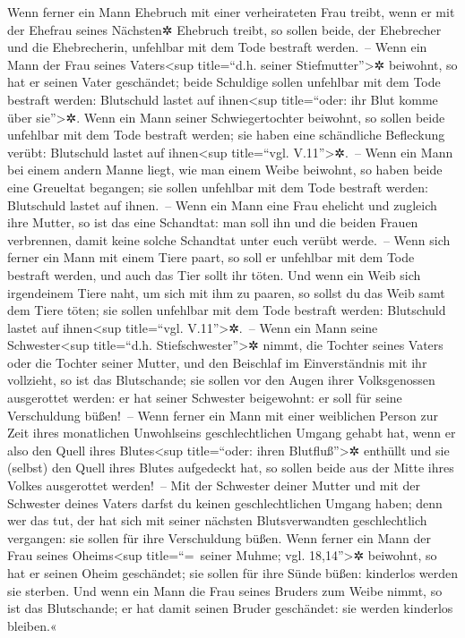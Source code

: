 Wenn ferner ein Mann Ehebruch mit einer verheirateten
Frau treibt, wenn er mit der Ehefrau seines Nächsten✲ Ehebruch treibt,
so sollen beide, der Ehebrecher und die Ehebrecherin, unfehlbar mit dem
Tode bestraft werden.~-- Wenn ein Mann der Frau seines
Vaters\textless sup title=``d.h. seiner Stiefmutter''\textgreater✲
beiwohnt, so hat er seinen Vater geschändet; beide Schuldige sollen
unfehlbar mit dem Tode bestraft werden: Blutschuld lastet auf
ihnen\textless sup title=``oder: ihr Blut komme über sie''\textgreater✲.
Wenn ein Mann seiner Schwiegertochter beiwohnt, so sollen
beide unfehlbar mit dem Tode bestraft werden; sie haben eine schändliche
Befleckung verübt: Blutschuld lastet auf ihnen\textless sup title=``vgl.
V.11''\textgreater✲.~-- Wenn ein Mann bei einem andern
Manne liegt, wie man einem Weibe beiwohnt, so haben beide eine Greueltat
begangen; sie sollen unfehlbar mit dem Tode bestraft werden: Blutschuld
lastet auf ihnen.~-- Wenn ein Mann eine Frau ehelicht und
zugleich ihre Mutter, so ist das eine Schandtat: man soll ihn und die
beiden Frauen verbrennen, damit keine solche Schandtat unter euch verübt
werde.~-- Wenn sich ferner ein Mann mit einem Tiere
paart, so soll er unfehlbar mit dem Tode bestraft werden, und auch das
Tier sollt ihr töten. Und wenn ein Weib sich irgendeinem
Tiere naht, um sich mit ihm zu paaren, so sollst du das Weib samt dem
Tiere töten; sie sollen unfehlbar mit dem Tode bestraft werden:
Blutschuld lastet auf ihnen\textless sup title=``vgl.
V.11''\textgreater✲.~-- Wenn ein Mann seine
Schwester\textless sup title=``d.h. Stiefschwester''\textgreater✲ nimmt,
die Tochter seines Vaters oder die Tochter seiner Mutter, und den
Beischlaf im Einverständnis mit ihr vollzieht, so ist das Blutschande;
sie sollen vor den Augen ihrer Volksgenossen ausgerottet werden: er hat
seiner Schwester beigewohnt: er soll für seine Verschuldung büßen!~--
Wenn ferner ein Mann mit einer weiblichen Person zur Zeit
ihres monatlichen Unwohlseins geschlechtlichen Umgang gehabt hat, wenn
er also den Quell ihres Blutes\textless sup title=``oder: ihren
Blutfluß''\textgreater✲ enthüllt und sie (selbst) den Quell ihres Blutes
aufgedeckt hat, so sollen beide aus der Mitte ihres Volkes ausgerottet
werden!~-- Mit der Schwester deiner Mutter und mit der
Schwester deines Vaters darfst du keinen geschlechtlichen Umgang haben;
denn wer das tut, der hat sich mit seiner nächsten Blutsverwandten
geschlechtlich vergangen: sie sollen für ihre Verschuldung büßen.
Wenn ferner ein Mann der Frau seines Oheims\textless sup
title=``=~seiner Muhme; vgl. 18,14''\textgreater✲ beiwohnt, so hat er
seinen Oheim geschändet; sie sollen für ihre Sünde büßen: kinderlos
werden sie sterben. Und wenn ein Mann die Frau seines
Bruders zum Weibe nimmt, so ist das Blutschande; er hat damit seinen
Bruder geschändet: sie werden kinderlos bleiben.«

